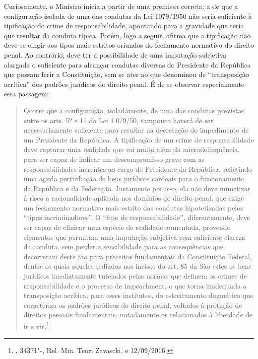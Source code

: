 Curiosamente, o Ministro inicia a partir de uma premissa correta: a de
que a configuração isolada de uma das condutas da Lei 1079/1950 não
seria suficiente à tipificação do crime de responsabilidade, apontando
para a gravidade que teria que resultar da conduta típica. Porém, logo a
seguir, afirma que a tipificação não deve se cingir aos tipos mais
estritos oriundos do fechamento normativo do direito penal. Ao
contrário, deve ter a possibilidade de uma imputação subjetiva alargada
o suficiente para alcançar condutas diversas do Presidente da República
que possam ferir a Constituição, sem se ater ao que denominou de
``transposição acrítica'' dos padrões jurídicos do direito penal. É de
se observar especialmente essa passagem:

\begin{quote}
Ocorre que a configuração, isoladamente, de uma das condutas previstas
entre os arts. 5º e 11 da Lei 1.079/50, tampouco haverá de ser
necessariamente suficiente para resultar na decretação do impedimento de
um Presidente da República. A tipificação de um crime de
responsabilidade deve capturar uma realidade que vai muito além da
microdelinquência, para ser capaz de indicar um descompromisso grave com
as responsabilidades inerentes ao cargo de Presidente da República,
refletindo uma aguda perturbação de bens jurídicos cardeais para o
funcionamento da República e da Federação. Justamente por isso, ela não
deve mimetizar à risca a racionalidade aplicada nos domínios do direito
penal, que exige um fechamento normativo mais estrito das condutas
hipotetizadas pelos ``tipos incriminadores''. O ``tipo de
responsabilidade'', diferentemente, deve ser capaz de clinicar uma
espécie de realidade aumentada, provendo elementos que permitam uma
imputação subjetiva com suficiente clareza da conduta, sem perder a
sensibilidade para as consequências que decorreram deste ato para
preceitos fundamentais da Constituição Federal, dentre os quais aqueles
sediados nos incisos do art. 85 da  São estes os bens jurídicos
imediatamente tutelados pelas normas que definem os crimes de
responsabilidade e o processo de impeachment, o que torna
inadequada a transposição acrítica, para esses institutos, do
estreitamento dogmático que caracteriza os padrões jurídicos do direito
penal, voltados à proteção de direitos pessoais fundamentais,
notadamente os relacionados à liberdade de ir e vir.\footnote{,  34371"-,
Rel. Min. Teori Zavascki, e 12/09/2016.}
\end{quote}

